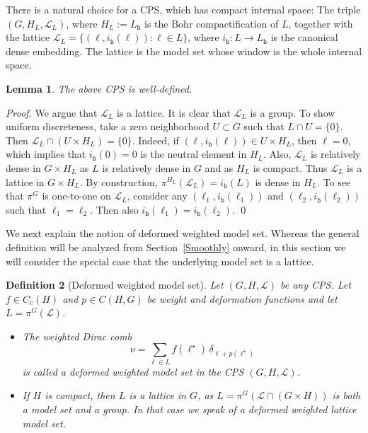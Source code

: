 \documentclass[11pt, a4wide]{amsart}
\newcommand{\cL}{\mathcal L}
\newtheorem{lemma}{Lemma}
\newtheorem{definition}[lemma]{Definition}
\numberwithin{lemma}{section}
\begin{document}
\medskip

There is a natural choice for a CPS, which has compact internal space: The triple $(G,H_L,\mathcal L_L)$, where  $H_L:=L_\mathsf{b}$ is the Bohr compactification of $L$, together with the lattice $\mathcal L_L=\{(\ell, i_\mathsf{b}(\ell)):\ell\in L\}$, where $i_\mathsf{b}: L\to L_\mathsf{b}$ is the canonical dense embedding. The lattice is the model set whose window is the whole internal space.


\begin{lemma}\label{lem:Bohrcps}
The above CPS is well-defined.
\end{lemma}

\begin{proof}
We argue that $\mathcal L_L$ is a lattice. It is clear that $\mathcal L_L$ is a group. To show uniform discreteness, take a zero neighborhood $U\subset G$ such that $L\cap U=\{0\}$. Then $\mathcal L_L\cap (U\times H_L)=\{0\}$. Indeed, if $(\ell, i_\mathsf{b}(\ell))\in U\times H_L$, then $\ell=0$, which implies that $i_\mathsf{b}(0)=0$ is the neutral element in $H_L$. Also, $\mathcal L_L$ is relatively dense in $G\times H_L$ as $L$ is relatively dense in $G$ and as $H_L$ is compact. Thus $\mathcal L_L$ is a lattice in $G\times H_L$. By construction, $\pi^{H_L}(\mathcal L_L)=i_\mathsf{b}(L)$ is dense in $H_L$. To see that $\pi^G$ is one-to-one on $\mathcal L_L$, consider any $(\ell_1, i_\mathsf{b}(\ell_1))$ and $(\ell_2, i_\mathsf{b}(\ell_2))$ such that $\ell_1=\ell_2$. Then also $i_\mathsf{b}(\ell_1)=i_\mathsf{b}(\ell_2)$.
\qed
\end{proof}

\medskip

We next explain the notion of deformed weighted model set. Whereas the general definition will be analyzed from Section~\ref{Smoothly} onward, in this section we will consider the special case that the underlying model set is a lattice.


\begin{definition}[Deformed weighted model set]\label{def:dwms}
%
Let $(G,H,\cL)$ be any CPS. Let $f\in C_c(H)$ and $p\in C(H,G)$ be weight and deformation functions and let $L=\pi^G(\cL)$.
\begin{itemize}
\item[(i)] The weighted Dirac comb
%
\begin{displaymath}
\nu=\sum_{\ell\in L}  f(\ell^\star)\, \delta_{\ell+p(\ell^\star)}
\end{displaymath}
%
is called a \textit{deformed weighted model set}  in the CPS $(G,H,\cL)$.

\item[(ii)] If $H$ is compact, then $L$ is a lattice in $G$, as $L=\pi^G(\cL\cap (G\times H))$ is both a model set and a group. In that case we speak of a \textit{deformed weighted lattice model set}.
\end{itemize}
\end{definition}
\end{document}
